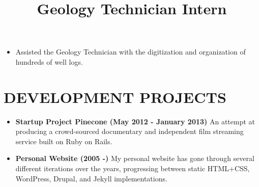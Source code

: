 \documentclass[line, overlapped]{res}
\begin{document}
\begin{resume}
    \title{Geology Technician Intern}
    \begin{position}
        \begin{itemize}
            \item Assisted the Geology Technician with the digitization and organization of hundreds of well logs.
        \end{itemize}
    \end{position}


    \section{DEVELOPMENT PROJECTS}
        \begin{itemize}[leftmargin=10pt]
        \item \textbf{Startup Project Pinecone (May 2012 - January 2013)} An attempt at producing a crowd-sourced documentary and independent film streaming service built on Ruby on Rails.
        \item \textbf{Personal Website (2005 -)} My personal website has gone through several different iterations over the years, progressing between static HTML+CSS, WordPress, Drupal, and Jekyll implementations.
        \end{itemize}

\end{resume}
\end{document}
